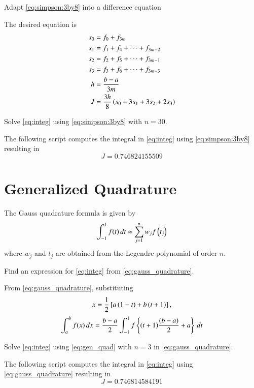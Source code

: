 \documentclass[journal,12pt,twocolumn]{IEEEtran}
\begin{document}
\begin{problem}
Adapt \eqref{eq:simpson:3by8} into a difference equation
\end{problem}

\solution The desired equation is
%
\begin{align}
\label{eq:simpson_3_8_diff}
s_0 &= f_0 + f_{3m}
\\
s_1 &= f_1 + f_4 + \dots + f_{3m-2}
\\
s_2 &= f_2 + f_5 + \dots + f_{3m-1}
\\
s_3 &= f_3 + f_6 + \dots + f_{3m-3}
\\
h &= \frac{b-a}{3m}	
\\
J &= \frac{3h}{8} \left(s_0 + 3s_1 + 3s_2 + 2s_3\right)
\end{align}
%
\begin{problem}
Solve \eqref{eq:integ}
using \eqref{eq:simpson:3by8} with $n =30$.
\end{problem}
\solution The following script computes the integral in \eqref{eq:integ} using \eqref{eq:simpson:3by8} resulting in
\begin{equation}
J = 0.746824155509
\end{equation}

\section{Generalized Quadrature}
%
The Gauss quadrature formula is given by \cite{kreyszig}
\begin{equation}
\label{eq:gauss_quadrature}
\int_{-1}^{1}f(t)\,dt \approx \sum_{j=1}^{n}w_jf\left(t_j\right)
\end{equation}
where $w_j$ and $t_j$ are obtained from the Legendre polynomial of order $n$.
%
\begin{problem}
Find an expression for \eqref{eq:integ} from \eqref{eq:gauss_quadrature}.
\end{problem}
%
\solution From \eqref{eq:gauss_quadrature}, substituting 
\begin{equation}
x = \frac{1}{2}{}\left[a\left(1-t\right)+ b\left(t+1\right)\right],
\end{equation}
%
\begin{align}
\label{eq:gen_quad}
\int_{a}^{b}f(x)\,dx  = \frac{b-a}{2}\int_{-1}^{1}f\left\{(t + 1)\frac{(b - a)}{2} + a\right\}\,dt  
\end{align}
%
%
\begin{problem}
Solve \eqref{eq:integ}
using \eqref{eq:gen_quad} with $n =3$ in \eqref{eq:gauss_quadrature}.
\end{problem}
\solution The following script computes the integral in \eqref{eq:integ} using \eqref{eq:gauss_quadrature} resulting in
\begin{equation}
J = 0.746814584191
\end{equation}


%
%

\end{document}
